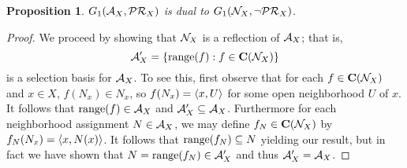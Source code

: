 \documentclass{amsart}
\newtheorem{proposition}[theorem]{Proposition}
\theoremstyle{definition}
\begin{document}
\begin{proposition}
\(G_{1}(\mathcal{A}_X,\mathcal{PR}_X)\) is dual to 
\(G_{1}(\mathcal{N}_X,\neg\mathcal{PR}_X)\).
\end{proposition}
\begin{proof}
We proceed by showing that \(\mathcal{N}_X\) is a reflection of \(\mathcal{A}_X\); that is,
\[\mathcal{A}_X'=\left\{\text{range}(f):f\in\mathbf C(\mathcal{N}_X)\right\}\]
is a selection basis for \(\mathcal{A}_X\). To see this, 
first observe that for each
\(f\in\mathbf C(\mathcal{N}_X)\) and \(x\in X\), \(f(N_x)\in N_x\), so
\(f(N_x)=\left\langle x,U\right\rangle\) for some open neighborhood \(U\) of \(x\). It follows
that \(\text{range}(f)\in\mathcal{A}_X\) and \(\mathcal{A}_X'\subseteq\mathcal{A}_X\). Furthermore 
for each neighborhood assignment 
\(N\in\mathcal{A}_X\), we may define \(f_N\in\mathbf C(\mathcal{N}_X)\) by 
\(f_N(N_x)=\left\langle x,N(x)\right\rangle\). It follows that
\(\text{range}(f_N)\subseteq N\) yielding our result, but in fact
we have shown that \(N=\text{range}(f_N)\in\mathcal{A}_X'\)
and thus \(\mathcal{A}_X'=\mathcal{A}_X\).
\end{proof}



\end{document}
